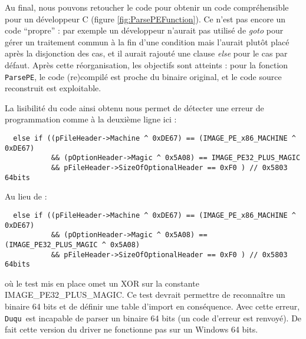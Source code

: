 \documentclass[times,11pt,fullpage]{article}
\newenvironment{changemargin}[2]{\begin{list}{}{%
\setlength{\topsep}{0pt}%
\setlength{\leftmargin}{0pt}%
\setlength{\rightmargin}{0pt}%
\setlength{\listparindent}{\parindent}%
\setlength{\itemindent}{\parindent}%
\setlength{\parsep}{0pt plus 1pt}%
\addtolength{\leftmargin}{#1}%
\addtolength{\rightmargin}{#2}%
}\item }{\end{list}}
\newcommand{\Duqu}{\texttt{Duqu}}
\begin{document}
Au final, nous pouvons retoucher le code pour obtenir un code compréhensible pour un développeur C (figure \ref{fig:ParsePEFunction}).
Ce n'est pas encore un code ``propre'' : par exemple un développeur n'aurait pas utilisé de \emph{goto} pour gérer un traitement commun à la fin d'une condition mais l'aurait plutôt placé après la disjonction des cas, et il aurait rajouté une clause \emph{else} pour le cas par défaut. Après cette réorganisation, les objectifs sont atteints : pour la fonction \texttt{ParsePE}, le code (re)compilé est proche du binaire original, et le code source reconstruit est exploitable.

La lisibilité du code ainsi obtenu nous permet de détecter une erreur de programmation comme à la deuxième ligne ici :

\begin{center}
\begin{changemargin}{2cm}{-2cm}
\scriptsize
\begin{verbatim}
  else if ((pFileHeader->Machine ^ 0xDE67) == (IMAGE_PE_x86_MACHINE ^ 0xDE67) 
           && (pOptionHeader->Magic ^ 0x5A08) == IMAGE_PE32_PLUS_MAGIC 
           && pFileHeader->SizeOfOptionalHeader == 0xF0 ) // 0x5803 64bits
\end{verbatim}

\hspace{-2cm} Au lieu de :

\begin{verbatim}
  else if ((pFileHeader->Machine ^ 0xDE67) == (IMAGE_PE_x86_MACHINE ^ 0xDE67) 
           && (pOptionHeader->Magic ^ 0x5A08) == (IMAGE_PE32_PLUS_MAGIC ^ 0x5A08) 
           && pFileHeader->SizeOfOptionalHeader == 0xF0 ) // 0x5803 64bits
\end{verbatim}

\end{changemargin}
\end{center}
où le test mis en place omet un XOR sur la constante IMAGE\_PE32\_PLUS\_MAGIC. Ce test devrait permettre de reconnaître un binaire 64 bits et de définir une table d'import en conséquence. Avec cette erreur, \Duqu\ est incapable de parser un binaire 64 bits (un code d'erreur est renvoyé). De fait cette version du driver ne fonctionne pas sur un Windows 64 bits.
\end{document}

